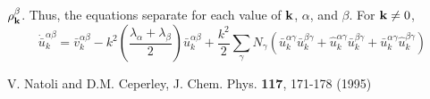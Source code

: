\documentclass{article}
\begin{document}
$\rho^\beta_{\mathbf{k}}$.  Thus, the equations separate for each value of
$\mathbf{k}$, $\alpha$, and $\beta$.  For $\mathbf{k} \neq 0$,
\begin{equation}
\dot{\bar{u}}_k^{\alpha \beta} = \bar{v}_k^{\alpha \beta} 
- k^2 \left(\frac{\lambda_\alpha+\lambda_\beta}{2}\right)
\bar{u}_k^{\alpha\beta} +\frac{k^2}{2} \sum_\gamma N_\gamma
\left(
\bar{u}_k^{\alpha \gamma} \bar{u}_k^{\beta \gamma} +
\hat{u}_k^{\alpha \gamma} \bar{u}_k^{\beta \gamma} +
\bar{u}_k^{\alpha \gamma} \hat{u}_k^{\beta \gamma}
\right)
\end{equation}




\begin{thebibliography}{9}
   V. Natoli and D.M. Ceperley, J. Chem. Phys. {\bf
  117}, 171-178 (1995)
\end{thebibliography}
\end{document}
